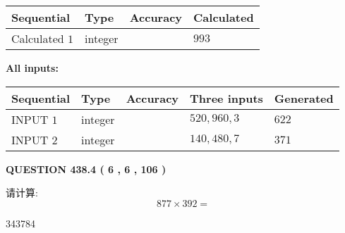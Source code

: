 \documentclass{ctexart}
\begin{document}
   
   
   
\noindent{}
   
   
  
  
\noindent\begin{tabular}{|l|l|l|l|}
\hline
 Sequential & Type & Accuracy & Calculated \\ 
\hline
 
 
  Calculated $  1 $ & integer &  & 
  $ 993 $ 
 \\  \hline  
 \end{tabular}
   
   
   
   
\noindent\vspace{0.1in}\hspace{-0.08in} {\textbf{\Large{All inputs: }}}
   
   
  
  
\noindent\begin{tabular}{|l|l|l|l|l|}
\hline
 Sequential & Type & Accuracy & Three inputs & Generated \\ 
\hline
 
 
  INPUT $  1 $ & integer &  & $
 520
 , 
 960
 , 
 3
 $ & $ 622 $ 
 \\  \hline  
 
 
  INPUT $  2 $ & integer &  & $
 140
 , 
 480
 , 
 7
 $ & $ 371 $ 
 \\  \hline  
 \end{tabular}
   
   
  
\vspace{0.2in}
  
{\textbf{\Large{QUESTION
438.4 
 ( 6 , 6 , 106 )
}}}
  
  
 
请计算:
\begin{equation}
877  \times    %
392 = \nonumber
\end{equation}
 
 
 
\noindent{}
 
 

343784
 
 
\noindent{}
 
 

 
 
 
\noindent{}
 
\end{document}
